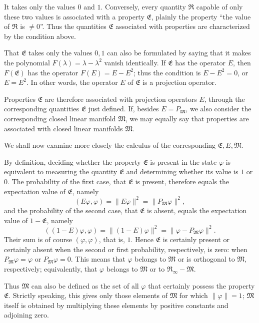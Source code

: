 \documentclass[fontsize=13pt,twoside,openany,headings=normal,parskip=false,bookmarkpackage=false,DIV=calc]{scrbook}
\begin{document}
It takes only the values $0$ and $1$. Conversely, every quantity $\mathfrak R$ capable of only these two values is associated with a property $\mathfrak E$, plainly the property ``the value of $\mathfrak R$ is $\ne0$''. Thus the
\hypertarget{origpage-132}{}%
quantities $\mathfrak E$ associated with properties are characterized by the condition above.

That $\mathfrak E$ takes only the values $0,1$ can also be formulated by saying that it makes the polynomial $F(\lambda)=\lambda-\lambda^2$ vanish identically. If $\mathfrak E$ has the operator $E$, then $F(\mathfrak E)$ has the operator $F(E)=E-E^2$; thus the condition is $E-E^2=0$, or $E=E^2$. In other words, the operator $E$ of $\mathfrak E$ is a projection operator.

Properties $\mathfrak E$ are therefore associated with projection operators $E$, through the corresponding quantities $\mathfrak E$ just defined. If, besides $E=P_{\mathfrak M}$, we also consider the corresponding closed linear manifold $\mathfrak M$, we may equally say that properties are associated with closed linear manifolds $\mathfrak M$.

We shall now examine more closely the calculus of the corresponding $\mathfrak E,E,\mathfrak M$.

By definition, deciding whether the property $\mathfrak E$ is present in the state $\varphi$ is equivalent to measuring the quantity $\mathfrak E$ and determining whether its value is $1$ or $0$. The probability of the first case, that $\mathfrak E$ is present, therefore equals the expectation value of $\mathfrak E$, namely
\[
(E\varphi,\varphi)=\|E\varphi\|^2=\|P_{\mathfrak M}\varphi\|^2,
\]
and the probability of the second case, that $\mathfrak E$ is absent, equals the expectation value of $1-\mathfrak E$, namely
\[
((1-E)\varphi,\varphi)=\|(1-E)\varphi\|^2=\|\varphi-P_{\mathfrak M}\varphi\|^2.
\]
Their sum is of course $(\varphi,\varphi)$, that is, $1$. Hence $\mathfrak E$ is certainly present or certainly absent when the second or first probability, respectively, is zero: when $P_{\mathfrak M}\varphi=\varphi$ or $P_{\mathfrak M}\varphi=0$. This means that $\varphi$ belongs to $\mathfrak M$ or is orthogonal to $\mathfrak M$, respectively; equivalently, that $\varphi$ belongs to $\mathfrak M$ or to $\mathfrak R_\infty-\mathfrak M$.

Thus $\mathfrak M$ can also be defined as the set of all $\varphi$ that certainly possess the property $\mathfrak E$. Strictly speaking, this gives only those elements of $\mathfrak M$ for which $\|\varphi\|=1$; $\mathfrak M$ itself is obtained by multiplying these elements by positive constants and adjoining zero.
\end{document}
